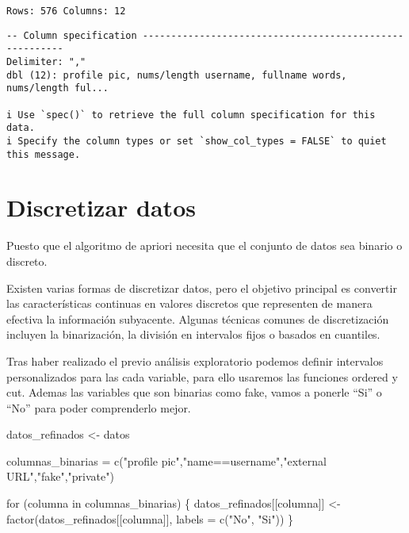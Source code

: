 \documentclass[
  letterpaper,
  DIV=11,
  numbers=noendperiod]{scrreprt}
\newenvironment{Shaded}{\begin{snugshade}}{\end{snugshade}}
\newcommand{\AttributeTok}[1]{\textcolor[rgb]{0.40,0.45,0.13}{#1}}
\newcommand{\ControlFlowTok}[1]{\textcolor[rgb]{0.00,0.23,0.31}{#1}}
\newcommand{\FunctionTok}[1]{\textcolor[rgb]{0.28,0.35,0.67}{#1}}
\newcommand{\NormalTok}[1]{\textcolor[rgb]{0.00,0.23,0.31}{#1}}
\newcommand{\OtherTok}[1]{\textcolor[rgb]{0.00,0.23,0.31}{#1}}
\newcommand{\StringTok}[1]{\textcolor[rgb]{0.13,0.47,0.30}{#1}}
\begin{document}
\begin{verbatim}
Rows: 576 Columns: 12
\end{verbatim}

\begin{verbatim}
-- Column specification --------------------------------------------------------
Delimiter: ","
dbl (12): profile pic, nums/length username, fullname words, nums/length ful...

i Use `spec()` to retrieve the full column specification for this data.
i Specify the column types or set `show_col_types = FALSE` to quiet this message.
\end{verbatim}

\section{Discretizar datos}\label{discretizar-datos}

Puesto que el algoritmo de apriori necesita que el conjunto de datos sea
binario o discreto.

Existen varias formas de discretizar datos, pero el objetivo principal
es convertir las características continuas en valores discretos que
representen de manera efectiva la información subyacente. Algunas
técnicas comunes de discretización incluyen la binarización, la división
en intervalos fijos o basados en cuantiles.

Tras haber realizado el previo análisis exploratorio podemos definir
intervalos personalizados para las cada variable, para ello usaremos las
funciones ordered y cut. Ademas las variables que son binarias como
fake, vamos a ponerle ``Si'' o ``No'' para poder comprenderlo mejor.

\begin{Shaded}
\begin{Highlighting}[]
\NormalTok{datos\_refinados }\OtherTok{\textless{}{-}}\NormalTok{ datos}

\NormalTok{columnas\_binarias }\OtherTok{=} \FunctionTok{c}\NormalTok{(}\StringTok{"profile pic"}\NormalTok{,}\StringTok{"name==username"}\NormalTok{,}\StringTok{"external URL"}\NormalTok{,}\StringTok{"fake"}\NormalTok{,}\StringTok{"private"}\NormalTok{)}

\ControlFlowTok{for}\NormalTok{ (columna }\ControlFlowTok{in}\NormalTok{ columnas\_binarias) \{}
\NormalTok{  datos\_refinados[[columna]] }\OtherTok{\textless{}{-}}  \FunctionTok{factor}\NormalTok{(datos\_refinados[[columna]], }\AttributeTok{labels =} \FunctionTok{c}\NormalTok{(}\StringTok{"No"}\NormalTok{, }\StringTok{"Si"}\NormalTok{))}
\NormalTok{\}}
\end{Highlighting}
\end{Shaded}
\end{document}
